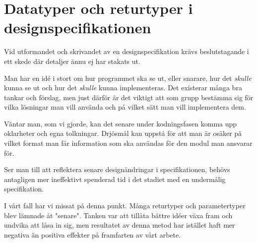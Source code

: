 \section{Datatyper och returtyper i designspecifikationen}

Vid utformandet och skrivandet av en designspecifikation krävs beslutstagande i ett skede där detaljer ännu ej har stakats ut.

Man har en idé i stort om hur programmet ska se ut, eller snarare, hur det \emph{skulle} kunna se ut och hur det \emph{skulle} kunna implementeras. Det existerar många bra tankar och förslag, men just därför är det viktigt att som grupp bestämma sig för vilka lösningar man vill använda och på vilket sätt man vill implementera dem.

Väntar man, som vi gjorde, kan det senare under kodningsfasen komma upp oklarheter och egna tolkningar. Drjösmål kan uppstå för att man är osäker på vilket format man får information som ska användas för den modul man ansvarar för.

Ser man till att reflektera senare designändringar i specifikationen, behövs antagligen mer ineffektivt spenderad tid i det stadiet med en undermålig specifikation.

I vårt fall har vi missat på denna punkt. Många returtyper och parametertyper blev lämnade åt "senare". Tanken var att tillåta bättre idéer växa fram och undvika att låsa in sig, men resultatet av denna metod har istället haft mer negativa än positiva effekter på framfarten av vårt arbete.
